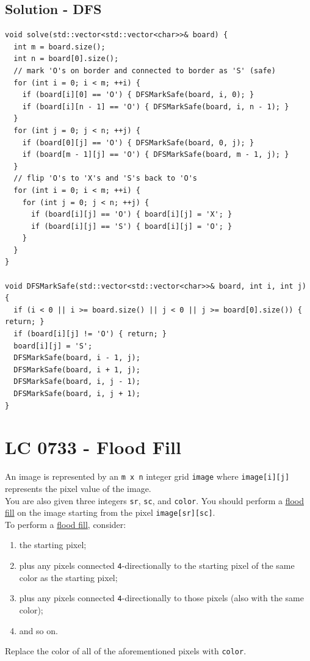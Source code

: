 \subsection*{Solution - DFS}
\begin{lstlisting}
void solve(std::vector<std::vector<char>>& board) {
  int m = board.size();
  int n = board[0].size();
  // mark 'O's on border and connected to border as 'S' (safe)
  for (int i = 0; i < m; ++i) {
    if (board[i][0] == 'O') { DFSMarkSafe(board, i, 0); }
    if (board[i][n - 1] == 'O') { DFSMarkSafe(board, i, n - 1); }
  }
  for (int j = 0; j < n; ++j) {
    if (board[0][j] == 'O') { DFSMarkSafe(board, 0, j); }
    if (board[m - 1][j] == 'O') { DFSMarkSafe(board, m - 1, j); }
  }
  // flip 'O's to 'X's and 'S's back to 'O's
  for (int i = 0; i < m; ++i) {
    for (int j = 0; j < n; ++j) {
      if (board[i][j] == 'O') { board[i][j] = 'X'; }
      if (board[i][j] == 'S') { board[i][j] = 'O'; }
    }
  }
}

void DFSMarkSafe(std::vector<std::vector<char>>& board, int i, int j) {
  if (i < 0 || i >= board.size() || j < 0 || j >= board[0].size()) { return; }
  if (board[i][j] != 'O') { return; }
  board[i][j] = 'S';
  DFSMarkSafe(board, i - 1, j);
  DFSMarkSafe(board, i + 1, j);
  DFSMarkSafe(board, i, j - 1);
  DFSMarkSafe(board, i, j + 1);
}
\end{lstlisting}

\section{LC 0733 - Flood Fill}
An image is represented by an {\colorbox{CodeBackground}{\lstinline|m x n|}} integer grid {\colorbox{CodeBackground}{\lstinline|image|}} where {\colorbox{CodeBackground}{\lstinline|image[i][j]|}} represents the pixel value of the image.\\

You are also given three integers {\colorbox{CodeBackground}{\lstinline|sr|}}, {\colorbox{CodeBackground}{\lstinline|sc|}}, and {\colorbox{CodeBackground}{\lstinline|color|}}. You should perform a \ul{flood fill} on the image starting from the pixel {\colorbox{CodeBackground}{\lstinline|image[sr][sc]|}}.\\

To perform a \ul{flood fill}, consider:
\begin{enumerate}
\item the starting pixel;
\item plus any pixels connected {\colorbox{CodeBackground}{\lstinline|4|}}-directionally to the starting pixel of the same color as the starting pixel;
\item plus any pixels connected {\colorbox{CodeBackground}{\lstinline|4|}}-directionally to those pixels (also with the same color);
\item and so on.
\end{enumerate}
Replace the color of all of the aforementioned pixels with {\colorbox{CodeBackground}{\lstinline|color|}}.\\

